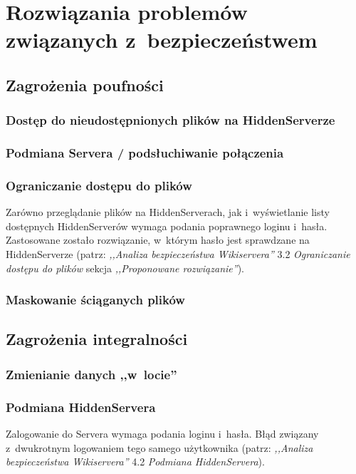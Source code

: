 \documentclass[a4paper,notitlepage]{article}
\begin{document}
\pagestyle{fancy}

\section{Rozwiązania problemów związanych z~bezpieczeństwem}
\subsection{Zagrożenia poufności}
\subsubsection{Dostęp do nieudostępnionych plików na HiddenServerze}
\subsubsection{Podmiana Servera / podsłuchiwanie połączenia}
\subsubsection{Ograniczanie dostępu do plików}
Zarówno przeglądanie plików na HiddenServerach, jak i~wyświetlanie
listy dostępnych HiddenServerów wymaga podania poprawnego loginu
i~hasła. Zastosowane zostało rozwiązanie, w~którym hasło jest 
sprawdzane na HiddenServerze (patrz: \emph{,,Analiza
bezpieczeństwa Wikiservera''} 3.2 \emph{Ograniczanie dostępu do plików}
sekcja \emph{,,Proponowane rozwiązanie''}).
\subsubsection{Maskowanie ściąganych plików}

\subsection{Zagrożenia integralności}
\subsubsection{Zmienianie danych ,,w~locie''}
\subsubsection{Podmiana HiddenServera}
\label{podmianaHS}
Zalogowanie do Servera wymaga podania loginu i~hasła. Błąd związany
z~dwukrotnym logowaniem tego samego użytkownika (patrz: \emph{,,Analiza
bezpieczeństwa Wikiservera''} 4.2 \emph{Podmiana HiddenServera}). 
\end{document}
